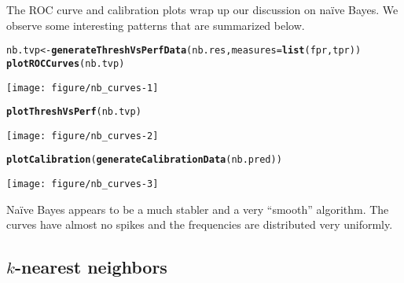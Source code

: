 \documentclass{article}\usepackage[]{graphicx}\usepackage[]{color}
\makeatletter
\def\maxwidth{ %
  \ifdim\Gin@nat@width>\linewidth
    \linewidth
  \else
    \Gin@nat@width
  \fi
}
\newcommand{\hlstd}[1]{\textcolor[rgb]{0.345,0.345,0.345}{#1}}%
\newcommand{\hlkwb}[1]{\textcolor[rgb]{0.69,0.353,0.396}{#1}}%
\newcommand{\hlkwc}[1]{\textcolor[rgb]{0.333,0.667,0.333}{#1}}%
\newcommand{\hlkwd}[1]{\textcolor[rgb]{0.737,0.353,0.396}{\textbf{#1}}}%
\newenvironment{kframe}{%
 \def\at@end@of@kframe{}%
 \ifinner\ifhmode%
  \def\at@end@of@kframe{\end{minipage}}%
  \begin{minipage}{\columnwidth}%
 \fi\fi%
 \def\FrameCommand##1{\hskip\@totalleftmargin \hskip-\fboxsep
 \colorbox{shadecolor}{##1}\hskip-\fboxsep
     \hskip-\linewidth \hskip-\@totalleftmargin \hskip\columnwidth}%
 \MakeFramed {\advance\hsize-\width
   \@totalleftmargin\z@ \linewidth\hsize
   \@setminipage}}%
 {\par\unskip\endMakeFramed%
 \at@end@of@kframe}
\newenvironment{knitrout}{}{} %
\makeatother
\begin{document}
The ROC curve and calibration plots wrap up our discussion on naïve Bayes.  We
observe some interesting patterns that are summarized below.

\pagebreak

\begin{knitrout}
\color{fgcolor}\begin{kframe}
\begin{alltt}
\hlstd{nb.tvp} \hlkwb{<-} \hlkwd{generateThreshVsPerfData}\hlstd{(nb.res,} \hlkwc{measures}\hlstd{=}\hlkwd{list}\hlstd{(fpr, tpr))}
\hlkwd{plotROCCurves}\hlstd{(nb.tvp)}
\end{alltt}
\end{kframe}

{\centering \texttt{[image: figure/nb\_curves-1]} 

}


\begin{kframe}\begin{alltt}
\hlkwd{plotThreshVsPerf}\hlstd{(nb.tvp)}
\end{alltt}
\end{kframe}

{\centering \texttt{[image: figure/nb\_curves-2]} 

}


\begin{kframe}\begin{alltt}
\hlkwd{plotCalibration}\hlstd{(}\hlkwd{generateCalibrationData}\hlstd{(nb.pred))}
\end{alltt}
\end{kframe}

{\centering \texttt{[image: figure/nb\_curves-3]} 

}



\end{knitrout}

Naïve Bayes appears to be a much stabler and a very ``smooth'' algorithm.  The
curves have almost no spikes and the frequencies are distributed very uniformly.

\subsection{$k$-nearest neighbors}
\end{document}
